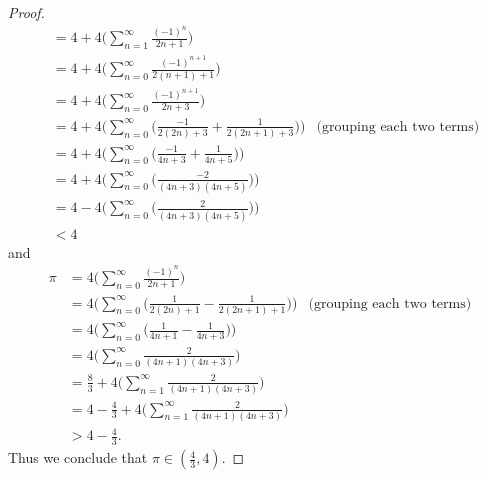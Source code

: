 \begin{proof}
\begin{align*}
        & = 4 + 4 \bigg(\sum_{n = 1}^\infty \frac{(-1)^n}{2n + 1}\bigg)                                                                         \\
        & = 4 + 4 \bigg(\sum_{n = 0}^\infty \frac{(-1)^{n + 1}}{2(n + 1) + 1}\bigg)                                                             \\
        & = 4 + 4 \bigg(\sum_{n = 0}^\infty \frac{(-1)^{n + 1}}{2n + 3}\bigg)                                                                   \\
        & = 4 + 4 \Bigg(\sum_{n = 0}^\infty \bigg(\frac{-1}{2(2n) + 3} + \frac{1}{2(2n + 1) + 3}\bigg)\Bigg) & \text{(grouping each two terms)} \\
        & = 4 + 4 \Bigg(\sum_{n = 0}^\infty \bigg(\frac{-1}{4n + 3} + \frac{1}{4n + 5}\bigg)\Bigg)                                              \\
        & = 4 + 4 \Bigg(\sum_{n = 0}^\infty \bigg(\frac{-2}{(4n + 3)(4n + 5)}\bigg)\Bigg)                                                       \\
        & = 4 - 4 \Bigg(\sum_{n = 0}^\infty \bigg(\frac{2}{(4n + 3)(4n + 5)}\bigg)\Bigg)                                                        \\
        & < 4
  \end{align*}
  and
  \begin{align*}
    \pi & = 4 \bigg(\sum_{n = 0}^\infty \frac{(-1)^n}{2n + 1}\bigg)                                                                        \\
        & = 4 \Bigg(\sum_{n = 0}^\infty \bigg(\frac{1}{2(2n) + 1} - \frac{1}{2(2n + 1) + 1}\bigg)\Bigg) & \text{(grouping each two terms)} \\
        & = 4 \Bigg(\sum_{n = 0}^\infty \bigg(\frac{1}{4n + 1} - \frac{1}{4n + 3}\bigg)\Bigg)                                              \\
        & = 4 \bigg(\sum_{n = 0}^\infty \frac{2}{(4n + 1)(4n + 3)}\bigg)                                                                   \\
        & = \frac{8}{3} + 4 \bigg(\sum_{n = 1}^\infty \frac{2}{(4n + 1)(4n + 3)}\bigg)                                                     \\
        & = 4 - \frac{4}{3} + 4 \bigg(\sum_{n = 1}^\infty \frac{2}{(4n + 1)(4n + 3)}\bigg)                                                 \\
        & > 4 - \frac{4}{3}.
  \end{align*}
  Thus we conclude that \(\pi \in (\frac{4}{3}, 4)\).
\end{proof}

